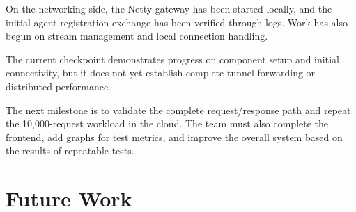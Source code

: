 \documentclass[11pt,a4paper,oneside]{report}
\begin{document}
On the networking side, the Netty gateway has been started
locally, and the initial agent registration exchange has
been verified through logs. Work has also begun on stream
management and local connection handling.

The current checkpoint demonstrates progress on component
setup and initial connectivity, but it does not yet establish
complete tunnel forwarding or distributed performance.

The next milestone is to validate the complete request/response
path and repeat the 10,000-request workload in the cloud. The team
must also complete the frontend, add graphs for test metrics, and
improve the overall system based on the results of repeatable tests.

\section{Future Work}
\end{document}
